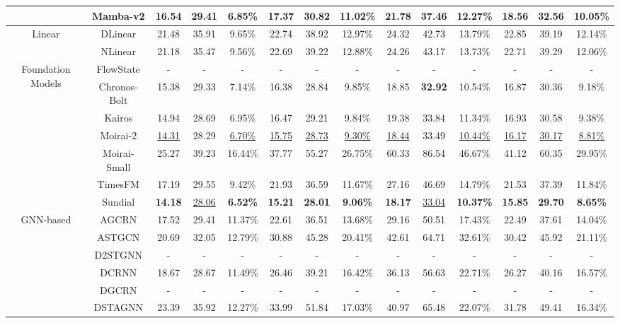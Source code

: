 \begin{table}[t]
{\begin{tabular}{c|c|c|c|c|c|c|c|c|c|c|c|c|c}
 & Mamba-v2 & 16.54 & 29.41 & 6.85\% & 17.37 & 30.82 & 11.02\% & 21.78 & 37.46 & 12.27\% & 18.56 & 32.56 & 10.05\% \\
\midrule
\multirow{2}{*}{Linear} & DLinear & 21.48 & 35.91 & 9.65\% & 22.74 & 38.92 & 12.97\% & 24.32 & 42.73 & 13.79\% & 22.85 & 39.19 & 12.14\% \\
 & NLinear & 21.18 & 35.47 & 9.56\% & 22.69 & 39.22 & 12.88\% & 24.26 & 43.17 & 13.73\% & 22.71 & 39.29 & 12.06\% \\
\midrule
\multirow{7}{*}{Foundation Models} & FlowState & - & - & - & - & - & - & - & - & - & - & - & - \\
 & Chronos-Bolt & 15.38 & 29.33 & 7.14\% & 16.38 & 28.84 & 9.85\% & 18.85 & \textbf{32.92} & 10.54\% & 16.87 & 30.36 & 9.18\% \\
 & Kairos & 14.94 & 28.69 & 6.95\% & 16.47 & 29.21 & 9.84\% & 19.38 & 33.84 & 11.34\% & 16.93 & 30.58 & 9.38\% \\
 & Moirai-2 & \underline{14.31} & 28.29 & \underline{6.70\%} & \underline{15.75} & \underline{28.73} & \underline{9.30\%} & \underline{18.44} & 33.49 & \underline{10.44\%} & \underline{16.17} & \underline{30.17} & \underline{8.81\%} \\
 & Moirai-Small & 25.27 & 39.23 & 16.44\% & 37.77 & 55.27 & 26.75\% & 60.33 & 86.54 & 46.67\% & 41.12 & 60.35 & 29.95\% \\
 & TimesFM & 17.19 & 29.55 & 9.42\% & 21.93 & 36.59 & 11.67\% & 27.16 & 46.69 & 14.79\% & 21.53 & 37.39 & 11.84\% \\
 & Sundial & \textbf{14.18} & \underline{28.06} & \textbf{6.52\%} & \textbf{15.21} & \textbf{28.01} & \textbf{9.06\%} & \textbf{18.17} & \underline{33.04} & \textbf{10.37\%} & \textbf{15.85} & \textbf{29.70} & \textbf{8.65\%} \\
\midrule
\multirow{10}{*}{GNN-based} & AGCRN & 17.52 & 29.41 & 11.37\% & 22.61 & 36.51 & 13.68\% & 29.16 & 50.51 & 17.43\% & 22.49 & 37.61 & 14.04\% \\
 & ASTGCN & 20.69 & 32.05 & 12.79\% & 30.88 & 45.28 & 20.41\% & 42.61 & 64.71 & 32.61\% & 30.42 & 45.92 & 21.11\% \\
 & D2STGNN & - & - & - & - & - & - & - & - & - & - & - & - \\
 & DCRNN & 18.67 & 28.67 & 11.49\% & 26.46 & 39.21 & 16.42\% & 36.13 & 56.63 & 22.71\% & 26.27 & 40.16 & 16.57\% \\
 & DGCRN & - & - & - & - & - & - & - & - & - & - & - & - \\
 & DSTAGNN & 23.39 & 35.92 & 12.27\% & 33.99 & 51.84 & 17.03\% & 40.97 & 65.48 & 22.07\% & 31.78 & 49.41 & 16.34\% \\

\end{tabular}}
\end{table}
